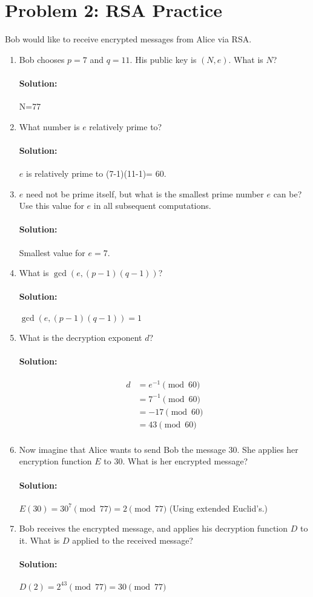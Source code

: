 \documentclass[11pt, notitlepage]{report}
\newcommand{\Question}[1]{\newpage\section{#1}}
\newenvironment{solution}{\paragraph{Solution:}}{\hfill}
\begin{document}
\Question{Problem 2: RSA Practice}

Bob would like to receive encrypted messages from Alice via RSA.
\begin{enumerate}[label=(\alph*)]
    \item Bob chooses $p = 7$ and $q = 11$. His public key is $(N,e)$.
    What is $N$?
	\begin{solution}
		N=77
	\end{solution}
    \item What number is $e$ relatively prime to?
	\begin{solution}
		$e$ is relatively prime to (7-1)(11-1)= 60.
	\end{solution}
    \item $e$ need not be prime itself, but what is the smallest prime number $e$ can be? Use this value for $e$ in all subsequent computations.
	\begin{solution}
		Smallest value for $e=7.$
	\end{solution}
    \item What is $\gcd(e,(p-1)(q-1))$?
	\begin{solution}
		$\gcd(e,(p-1)(q-1))=1$
	\end{solution}
    \item What is the decryption exponent $d$? 
    \begin{solution} 
    \begin{align*}
			d&=e^{-1} \pmod{60}\\
			&=7^{-1} \pmod{60}\\
			&=-17 \pmod{60}\\
			&=43 \pmod{60}\\
		\end{align*}
	\end{solution}
    \item Now imagine that Alice wants to send Bob the message $30$. She applies her encryption function $E$ to $30$. What is her encrypted message?
	\begin{solution}
		$E(30)=30^{7}\pmod{77}=2\pmod{77}$ (Using extended Euclid's.)
	\end{solution}
    \item Bob receives the encrypted message, and applies his decryption function $D$ to it.
    What is $D$ applied to the received message?
    \begin{solution}
    	$D(2)=2^{43}\pmod{77}=30\pmod{77}$
    \end{solution}

\end{enumerate}
\end{document}
